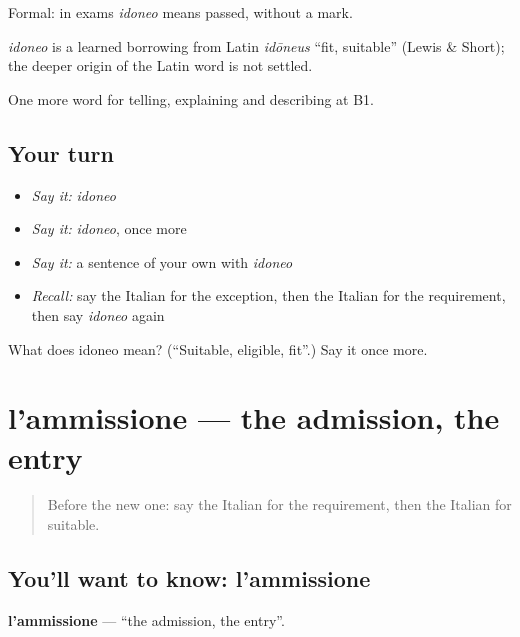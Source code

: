 Formal: in exams \emph{idoneo} means passed, without a mark.

\begin{cousinweb}
\emph{idoneo} is a learned borrowing from Latin \emph{idōneus} \textquotedblleft{}fit, suitable\textquotedblright{} (Lewis \& Short); the deeper origin of the Latin word is not settled.
\end{cousinweb}

\begin{grammarlens}[title={What you've built}]
One more word for telling, explaining and describing at B1.
\end{grammarlens}

\subsection*{Your turn}
\begin{itemize}
\raggedright
  \item \emph{Say it:} \emph{idoneo}
  \item \emph{Say it:} \emph{idoneo}, once more
  \item \emph{Say it:} a sentence of your own with \emph{idoneo}
  \item \emph{Recall:} say the Italian for the exception, then the Italian for the requirement, then say \emph{idoneo} again
\end{itemize}

\begin{tcolorbox}[breakable,colback=teal!4,colframe=teal!35!black,title={Before you move on}]
What does idoneo mean? (\textquotedblleft{}Suitable, eligible, fit\textquotedblright{}.) Say it once more.
\end{tcolorbox}
\section[l'ammissione]{l'ammissione — the admission, the entry}

\label{lesson:IT-C387-ammissione}



\begin{quote}
Before the new one: say the Italian for the requirement, then the Italian for suitable.
\end{quote}

\subsection*{You'll want to know: l'ammissione}
\textbf{l'ammissione} — \textquotedblleft{}the admission, the entry\textquotedblright{}.

